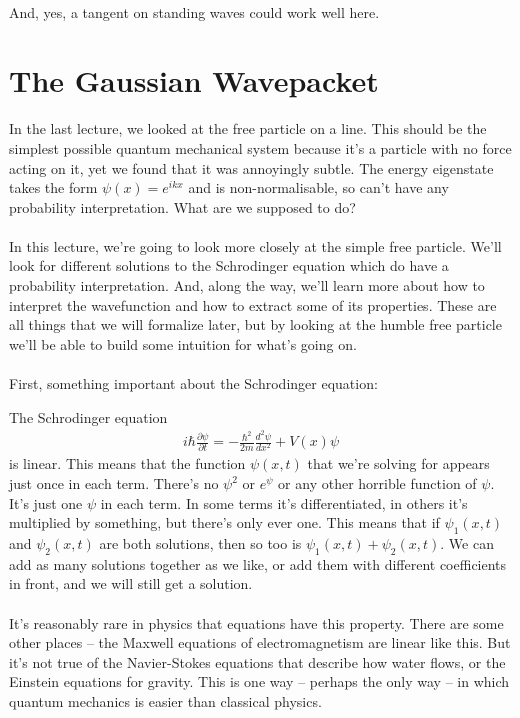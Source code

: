 \documentclass[12pt]{article}
\def\be{\begin{eqnarray}}
\def\ee{\end{eqnarray}}
\newcommand{\nn}{\nonumber}
\newcommand\para{\paragraph{}}
\newcommand{\ppp}[2]{\frac{\partial {#1}}{\partial {#2}}}
\begin{document}
\para
And, yes, a tangent on standing waves could work well here.





\newpage
\section{The Gaussian Wavepacket}

In the last lecture, we looked at the free particle on a line. This should be the simplest possible quantum mechanical system because it's a particle with no force acting on it, yet we found that it was annoyingly subtle. The energy eigenstate takes the form $\psi(x) = e^{ikx}$ and is non-normalisable, so can't have any probability interpretation. What are we supposed to do?

\para
In this lecture, we're going to look more closely at the simple free particle. We'll look for different solutions to the Schrodinger equation which do have a probability interpretation. And, along the way, we'll learn more about how to interpret the wavefunction and how to extract some of its properties. These are all things that we will formalize later, but by looking at the humble free particle we'll be able to build some intuition for what's going on.

\para
First, something important about the Schrodinger equation:

{\color{olive} The Schrodinger equation 
%
\be i\hbar \ppp{\psi}{t} = -\frac{\hbar^2}{2m} \frac{d^2\psi}{dx^2} + V(x) \psi\nn\ee
%
is linear.} This means that the function $\psi(x,t)$ that we're solving for appears just once in each term. There's no $\psi^2$ or $e^\psi$ or any other horrible function of $\psi$. It's just one $\psi$ in each term. In some terms it's differentiated, in others it's multiplied by something, but there's only ever one. {\color{olive} This means that if $\psi_1(x,t)$ and $\psi_2(x,t)$ are both solutions, then so too is $\psi_1(x,t) + \psi_2(x,t)$.} We can add as many solutions together as we like, or add them with different coefficients in front, and we will still get a solution. 


\para
It's reasonably rare in physics that equations have this property. There are some other places -- the Maxwell equations of electromagnetism are linear like this. But it's not true of the Navier-Stokes equations that describe how water flows, or the Einstein equations for gravity. This is one way -- perhaps the only way -- in which quantum mechanics is easier than classical physics.
\end{document}
